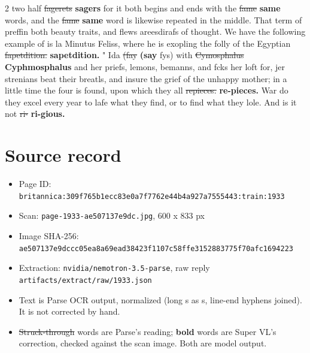 \documentclass[10pt]{article}
\begin{document}
\begin{multicols}{2}
two half \sout{fagerets} \textbf{sagers} for it both begins and ends with the \sout{fame} \textbf{same} words, and the \sout{fame} \textbf{same} word is likewise repeated in the middle. That term of preffin both beauty traits, and flews areesdirafs of thought. We have the following example of is la Minutus Feliss, where he is exopling the folly of the Egyptian \sout{fapetdition.} \textbf{sapetdition.} " Ida \sout{(fay} \textbf{(say} fys) with \sout{Cymosphalus} \textbf{Cyphmosphalus} and her priefs, lemons, bemanns, and fcks her loft for, jer strenians beat their breatls, and insure the grief of the unhappy mother; in a little time the four is found, upon which they all \sout{repieces.} \textbf{re-pieces.} War do they excel every year to lafe what they find, or to find what they lole. And is it not \sout{ri-} \textbf{ri-gious.}
\end{multicols}
\section*{Source record}
\begin{itemize}
\item Page ID: \texttt{britannica:309f765b1ecc83e0a7f7762e44b4a927a7555443:train:1933}
\item Scan: \texttt{page-1933-ae507137e9dc.jpg}, 600 x 833 px
\item Image SHA-256: \texttt{\small ae507137e9dccc05ea8a69ead38423f1107c58ffe3152883775f70afc1694223}
\item Extraction: \texttt{nvidia/nemotron-3.5-parse}, raw reply \texttt{artifacts/extract/raw/1933.json}
\item Text is Parse OCR output, normalized (long s as s, line-end hyphens joined). It is not corrected by hand.
\item \sout{Struck-through} words are Parse's reading; \textbf{bold} words are Super VL's correction, checked against the scan image. Both are model output.
\end{itemize}
\end{document}
